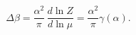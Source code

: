 \begin{equation}
\Delta\beta = \frac{\alpha^2}{\pi}\,\frac{d\ln Z}{d\ln\mu}
= \frac{\alpha^2}{\pi}\gamma(\alpha).
\end{equation}

